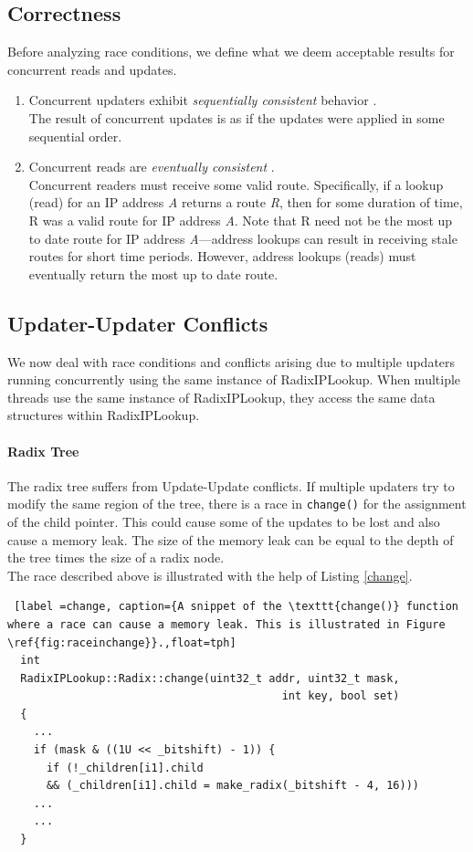 \documentclass[a4paper]{article}
\begin{document}
\subsection{Correctness}
\label{sec:correctness}
Before analyzing race conditions, we define what we deem acceptable results for concurrent reads and updates.
\begin{enumerate}
\item Concurrent updaters exhibit \emph{sequentially consistent} behavior \cite{seqconsistency}.\\ The result of concurrent updates is as if the updates were applied in some sequential order.
\item Concurrent reads are \emph{eventually consistent} \cite{eventualconsistency}.\\ Concurrent readers must receive some valid route. Specifically, if a lookup (read) for an IP address \emph{A} returns a route \emph{R}, then for some duration of time, R was a valid route for IP address \emph{A}. Note that R need not be the most up to date route for IP address \emph{A}---address lookups can result in receiving stale routes for short time periods. However, address lookups (reads) must eventually return the most up to date route.

\end{enumerate} 
\subsection{Updater-Updater Conflicts}
We now deal with race conditions and conflicts arising due to multiple updaters running concurrently using the same instance of RadixIPLookup. When multiple threads use the same instance of RadixIPLookup, they access the same data structures within RadixIPLookup.
\paragraph{Radix Tree}
The radix tree suffers from Update-Update conflicts. If multiple updaters try to modify the same region of the tree, there is a race in \verb+change()+ for the assignment of the child pointer. This could cause some of the updates to be lost and also cause a memory leak. The size of the memory leak can be equal to the depth of the tree times the size of a radix node.\\

The race described above is illustrated with the help of Listing \ref{change}.
\begin{lstlisting} [label =change, caption={A snippet of the \texttt{change()} function where a race can cause a memory leak. This is illustrated in Figure \ref{fig:raceinchange}}.,float=tph]
  int
  RadixIPLookup::Radix::change(uint32_t addr, uint32_t mask,
                                          int key, bool set)
  {
    ...
    if (mask & ((1U << _bitshift) - 1)) {
      if (!_children[i1].child
      && (_children[i1].child = make_radix(_bitshift - 4, 16)))
    ...
    ...
  }
\end{lstlisting}
\end{document}
